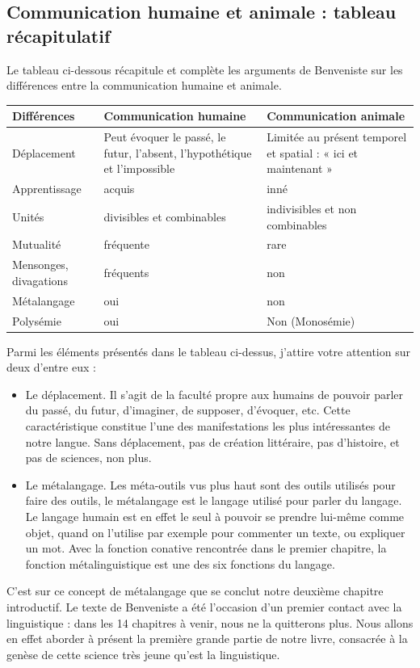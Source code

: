 \subsection{Communication humaine et animale : tableau récapitulatif}
Le tableau ci-dessous récapitule et complète les arguments de Benveniste sur les différences entre la communication humaine et animale.
\begin{center}\small\renewcommand{\arraystretch}{1.2}
\begin{tabularx}{\linewidth}{|>{\centering\arraybackslash}p{.21\linewidth}|>{\centering\arraybackslash}X|>{\centering\arraybackslash}X|}
\hline
\textbf{Différences}&\textbf{Communication humaine}&\textbf{Communication animale}\\\hline
Déplacement&Peut évoquer le passé, le futur, l’absent, l’hypothétique et l’impossible&Limitée au présent temporel et spatial : « ici et maintenant »\\\hline
Apprentissage&acquis&inné\\\hline
Unités&divisibles et combinables&indivisibles et non combinables\\\hline
Mutualité&fréquente&rare\\\hline
Mensonges, divagations&fréquents&non\\\hline
Métalangage&oui&non\\\hline
Polysémie&oui&Non (Monosémie)\\\hline
\end{tabularx}
\end{center}
Parmi les éléments présentés dans le tableau ci-dessus, j’attire votre attention sur deux d’entre eux :
\begin{itemize}
\item Le déplacement. Il s’agit de la faculté propre aux humains de pouvoir parler du passé, du futur, d’imaginer, de supposer, d’évoquer, etc. Cette caractéristique constitue l’une des manifestations les plus intéressantes de notre langue. Sans déplacement, pas de création littéraire, pas d’histoire, et pas de sciences, non plus.
\item Le métalangage. Les méta-outils vus plus haut sont des outils utilisés pour faire des outils, le métalangage est le langage utilisé pour parler du langage. Le langage humain est en effet le seul à pouvoir se prendre lui-même comme objet, quand on l’utilise par exemple pour commenter un texte, ou expliquer un mot. Avec la fonction conative rencontrée dans le premier chapitre, la fonction métalinguistique est une des six fonctions du langage.
\end{itemize}
C’est sur ce concept de métalangage que se conclut notre deuxième chapitre introductif. Le texte de Benveniste a été l’occasion d’un premier contact avec la linguistique : dans les 14 chapitres à venir, nous ne la quitterons plus. Nous allons en effet aborder à présent la première grande partie de notre livre, consacrée à la genèse de cette science très jeune qu’est la linguistique.
